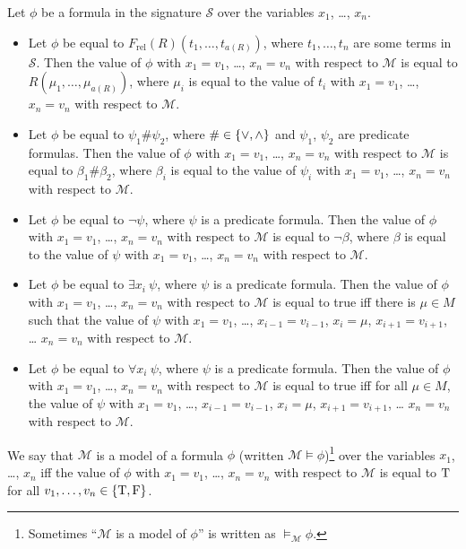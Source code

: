 \begin{definition}
  Let $\phi$ be a formula in the signature $\mathcal{S}$ over the variables
  $x_1$, \dots, $x_n$.
  \begin{itemize}
    \item Let $\phi$ be equal to $F_\mathrm{rel}(R)(t_1, \dots, t_{a(R)})$,
      where $t_1, \dots, t_n$ are some terms in $\mathcal{S}$. Then the value
      of $\phi$ with $x_1 = v_1$, \dots, $x_n = v_n$ with respect to
      $\mathcal{M}$ is equal to $R(\mu_1, \dots, \mu_{a(R)})$, where $\mu_i$
      is equal to the value of $t_i$ with $x_1 = v_1$, \dots, $x_n = v_n$ with
      respect to $\mathcal{M}$.
    \item Let $\phi$ be equal to $\psi_1 \# \psi_2$, where
      $\# \in \set{\lor, \land}$ and $\psi_1$, $\psi_2$ are predicate
      formulas. Then the value of $\phi$ with $x_1 = v_1$, \dots, $x_n = v_n$
      with respect to $\mathcal{M}$ is equal to $\beta_1 \# \beta_2$, where
      $\beta_i$ is equal to the value of $\psi_i$ with $x_1 = v_1$, \dots,
      $x_n = v_n$ with respect to $\mathcal{M}$.
    \item Let $\phi$ be equal to $\lnot \psi$, where
      $\psi$ is a predicate formula.
      Then the value of $\phi$ with $x_1 = v_1$, \dots, $x_n = v_n$ with
      respect to $\mathcal{M}$ is equal to $\lnot \beta$, where
      $\beta$ is equal to the value of $\psi$ with $x_1 = v_1$, \dots,
      $x_n = v_n$ with respect to $\mathcal{M}$.
    \item Let $\phi$ be equal to $\exists x_i ~ \psi$, where
      $\psi$ is a predicate formula.
      Then the value of $\phi$ with $x_1 = v_1$, \dots, $x_n = v_n$ with
      respect to $\mathcal{M}$ is equal to true iff there is $\mu \in M$
      such that the value of $\psi$ with $x_1 = v_1$, \dots,
      $x_{i - 1} = v_{i - 1}$, $x_i = \mu$, $x_{i + 1} = v_{i + 1}$, \dots
      $x_n = v_n$ with respect to $\mathcal{M}$.
    \item Let $\phi$ be equal to $\forall x_i ~ \psi$, where
      $\psi$ is a predicate formula.
      Then the value of $\phi$ with $x_1 = v_1$, \dots, $x_n = v_n$ with
      respect to $\mathcal{M}$ is equal to true iff for all $\mu \in M$,
      the value of $\psi$ with $x_1 = v_1$, \dots,
      $x_{i - 1} = v_{i - 1}$, $x_i = \mu$, $x_{i + 1} = v_{i + 1}$, \dots
      $x_n = v_n$ with respect to $\mathcal{M}$.
  \end{itemize}
\end{definition}

We say that $\mathcal{M}$ is a model of a formula $\phi$
(written $\mathcal{M} \models \phi$)\footnote{
  Sometimes ``$\mathcal{M}$ is a model of $\phi$'' is written
  as $\models_\mathcal{M} \phi$.
} over the variables
$x_1$, \dots, $x_n$ iff the value of $\phi$ with $x_1 = v_1$, \dots,
$x_n = v_n$ with respect to $\mathcal{M}$ is equal to $\text{T}$ for all
$v_1, \dots, v_n \in \set{\ltrue, \lfalse}$.

